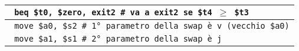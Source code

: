 \documentclass[../main.tex]{subfiles}
\begin{document}
\begin{tabular}{ l }
    \texttt{\hspace*{0cm} \hspace*{0cm} \hspace*{0cm} \hspace*{0cm} \hspace*{0cm} \hspace*{0cm} \hspace*{0cm} \hspace*{0cm} \hspace*{0cm} beq \$t0, \$zero, exit2 \hspace*{0cm} \# va a exit2 se \$t4 $\geq$ \$t3} \\
    \hline
    \hline
    \texttt{\hspace*{0cm} \hspace*{0cm} \hspace*{0cm} \hspace*{0cm} \hspace*{0cm} \hspace*{0cm} \hspace*{0cm} \hspace*{0cm} \hspace*{0cm} move \$a0, \$s2 \hspace*{0cm} \hspace*{0cm} \hspace*{0cm} \hspace*{0cm} \hspace*{0cm} \hspace*{0cm} \hspace*{0cm} \hspace*{0cm} \hspace*{0cm} \# 1° parametro della swap è v (vecchio \$a0)} \\
    \texttt{\hspace*{0cm} \hspace*{0cm} \hspace*{0cm} \hspace*{0cm} \hspace*{0cm} \hspace*{0cm} \hspace*{0cm} \hspace*{0cm} \hspace*{0cm} move \$a1, \$s1 \hspace*{0cm} \hspace*{0cm} \hspace*{0cm} \hspace*{0cm} \hspace*{0cm} \hspace*{0cm} \hspace*{0cm} \hspace*{0cm} \hspace*{0cm} \# 2° parametro della swap è j} \\

\end{tabular}
\end{document}

